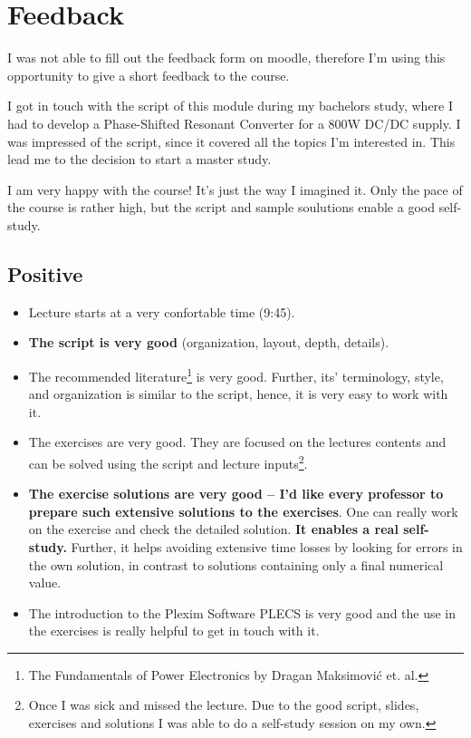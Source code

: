 \section{Feedback}

I was not able to fill out the feedback form on moodle, therefore I'm using
this opportunity to give a short feedback to the course.

I got in touch with the script of this module during my bachelors study,
where I had to develop a Phase-Shifted Resonant Converter for a 800W DC/DC supply.
I was impressed of the script, since it covered all the topics I'm interested in. 
This lead me to the decision to start a master study. 

I am very happy with the course! It's just the way I imagined it. Only the pace
of the course is rather high, but the script and sample soulutions enable a good
self-study.

\subsection{Positive}

\begin{itemize}
	\item Lecture starts at a very confortable time (9:45).
	\item \textbf{The script is very good} (organization, layout, depth, details).
	\item The recommended literature\footnote{The Fundamentals of Power
		Electronics by Dragan Maksimovi\'c et. al.} is very good.
		Further, its' terminology, style, and organization is similar
		to the script, hence, it is very easy to work with it.
	\item The exercises are very good. They are focused on the lectures
		contents and can be solved using the script and lecture
		inputs\footnote{Once I was sick and missed the lecture. Due to
		the good script, slides, exercises and solutions I was able
		to do a self-study session on my own.}.
	\item \textbf{The exercise solutions are very good -- I'd like every
		professor to prepare such extensive solutions to the exercises}.
		One can really work on the exercise and check the detailed
		solution. \textbf{It enables a real self-study.} Further, it
		helps avoiding extensive time losses by looking for errors
		in the own solution, in contrast to solutions containing only
		a final numerical value.
	\item The introduction to the Plexim Software PLECS is very
		good and the use in the exercises is really helpful to get
		in touch with it.
\end{itemize}

